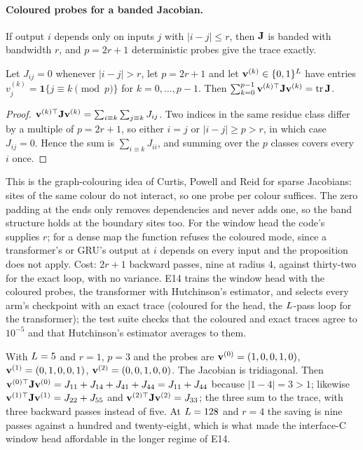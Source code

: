 \paragraph{Coloured probes for a banded Jacobian.} If output $i$ depends only on inputs
$j$ with $|i-j|\le r$, then $\mathbf{J}$ is banded with bandwidth $r$, and $p=2r+1$
deterministic probes give the trace exactly.

\begin{proposition}
\label{prop:coloured}
Let $J_{ij}=0$ whenever $|i-j|>r$, let $p=2r+1$ and let $\mathbf{v}^{(k)}\in\{0,1\}^{L}$
have entries $v^{(k)}_j=\mathbf 1\{j\equiv k\pmod p\}$ for $k=0,\dots,p-1$. Then
$\sum_{k=0}^{p-1}\mathbf{v}^{(k)\top}\mathbf{J}\mathbf{v}^{(k)}=\operatorname{tr}\mathbf{J}$.
\end{proposition}
\begin{proof}
$\mathbf{v}^{(k)\top}\mathbf{J}\mathbf{v}^{(k)}=\sum_{i\equiv k}\sum_{j\equiv k}J_{ij}$. Two indices in the
same residue class differ by a multiple of $p=2r+1$, so either $i=j$ or $|i-j|\ge p>r$,
in which case $J_{ij}=0$. Hence the sum is $\sum_{i\equiv k}J_{ii}$, and summing over the
$p$ classes covers every $i$ once.
\end{proof}

This is the graph-colouring idea of Curtis, Powell and Reid for sparse Jacobians: sites
of the same colour do not interact, so one probe per colour suffices. The zero padding at
the ends only removes dependencies and never adds one, so the band structure holds at
the boundary sites too. For the window head the code's  supplies
$r$; for a dense map the function refuses the coloured mode, since a transformer's or
GRU's output at $i$ depends on every input and the proposition does not apply. Cost:
$2r+1$ backward passes, nine at radius $4$, against thirty-two for the exact loop, with
no variance. E14 trains the window head with the coloured probes, the transformer with
Hutchinson's estimator, and selects every arm's checkpoint with an exact trace
(coloured for the head, the $L$-pass loop for the transformer); the test suite
checks that the coloured and exact traces agree to $10^{-5}$ and that Hutchinson's
estimator averages to them.

\begin{example}
\label{ex:coloured}
With $L=5$ and $r=1$, $p=3$ and the probes are
$\mathbf{v}^{(0)}=(1,0,0,1,0)$, $\mathbf{v}^{(1)}=(0,1,0,0,1)$, $\mathbf{v}^{(2)}=(0,0,1,0,0)$.
The Jacobian is tridiagonal. Then
$\mathbf{v}^{(0)\top}\mathbf{J}\mathbf{v}^{(0)}=J_{11}+J_{14}+J_{41}+J_{44}=J_{11}+J_{44}$ because
$|1-4|=3>1$; likewise $\mathbf{v}^{(1)\top}\mathbf{J}\mathbf{v}^{(1)}=J_{22}+J_{55}$ and
$\mathbf{v}^{(2)\top}\mathbf{J}\mathbf{v}^{(2)}=J_{33}$; the three sum to the trace, with three
backward passes instead of five. At $L=128$ and $r=4$ the saving is nine passes
against a hundred and twenty-eight, which is what made the interface-C window head
affordable in the longer regime of E14.
\end{example}

